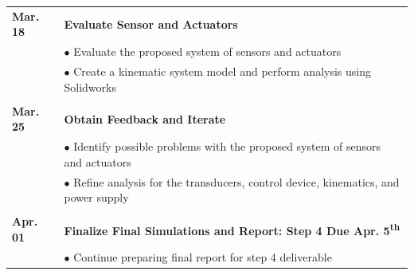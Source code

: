 \documentclass[12pt]{article}
\newcommand{\ts}{\textsuperscript}
\begin{document}
\begin{flushleft}
\begin{tabular}{l | l}
\textbf{Mar. 18} & \textbf{Evaluate Sensor and Actuators}\\
 & $\bullet$ Evaluate the proposed system of sensors and actuators\\
  & $\bullet$ Create a kinematic system model and perform analysis using Solidworks\\\\
  
\textbf{Mar. 25} & \textbf{Obtain Feedback and Iterate}\\
  & $\bullet$ Identify possible problems with the proposed system of sensors and actuators\\
  & $\bullet$ Refine analysis for the transducers, control device, kinematics, and power supply\\\\
  
\textbf{Apr. 01} & \textbf{Finalize Final Simulations and Report: Step 4 Due Apr. 5\ts{th}}\\
 & $\bullet$ Continue preparing final report for step 4 deliverable\\

\end{tabular}
\end{flushleft}
\end{document}

